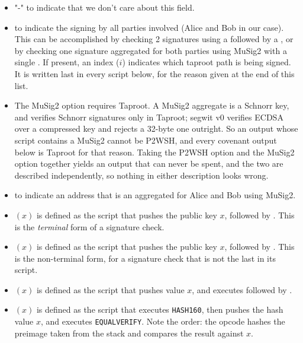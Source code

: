 \begin{itemize}
\item "-" to indicate that we don't care about this field.

\item {} to indicate the signing by all parties involved (Alice and Bob in our case). This can be accomplished by checking 2 signatures using a  followed by a , or by checking one signature aggregated for both parties using MuSig2 with a single . If present, an index ($i$) indicates which taproot path is being signed. It is written last in every script below, for the reason given at the end of this list.

\item The MuSig2 option requires Taproot. A MuSig2 aggregate is a Schnorr key, and  verifies Schnorr signatures only in Taproot; segwit v0 verifies ECDSA over a compressed key and rejects a 32-byte one outright. So an output whose script contains a MuSig2  cannot be P2WSH, and every covenant output below is Taproot for that reason. Taking the P2WSH option and the MuSig2 option together yields an output that can never be spent, and the two are described independently, so nothing in either description looks wrong.

\item {} to indicate an address that is an aggregated for Alice and Bob using MuSig2.

\item {}$(x)$ is defined as the script that pushes the public key $x$, followed by . This is the \emph{terminal} form of a signature check.

\item {}$(x)$ is defined as the script that pushes the public key $x$, followed by . This is the non-terminal form, for a signature check that is not the last in its script.

\item {}$(x)$ is defined as the script that pushes value $x$,  and executes   followed by .

\item {}$(x)$ is defined as the script that executes \texttt{HASH160}, then pushes the hash value $x$, and executes \texttt{EQUALVERIFY}. Note the order: the opcode hashes the preimage taken from the stack and compares the result against $x$.


\end{itemize}

